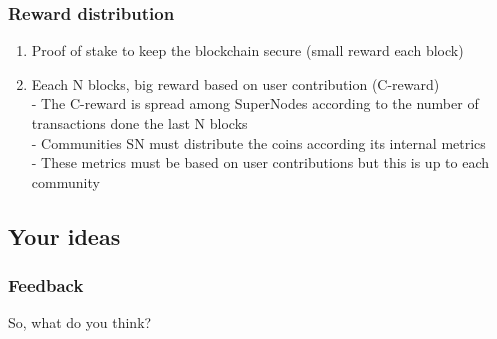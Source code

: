 \documentclass[usepdftitle=false,13pt]{beamer}
\begin{document}
\begin{frame}\frametitle{Reward distribution}
\begin{enumerate}
		\item Proof of stake to keep the blockchain secure (small reward each block)
		\item Eeach N blocks, big reward based on user contribution (C-reward)\\
		 - The C-reward is spread among SuperNodes according to the number of transactions done the last N blocks \\
		 - Communities SN must distribute the coins according its internal metrics\\
		 - These metrics must be based on user contributions but this is up to each community
\end{enumerate}
\end{frame}

\subsection{Your ideas}

\begin{frame}\frametitle{Feedback}
	\begin{center}
	  So, what do you think?
	\end{center}

\end{frame}

\frame{\titlepage}
\end{document}
